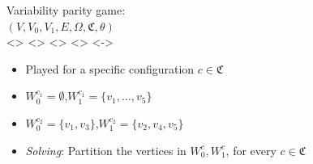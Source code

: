 \documentclass[aspectratio=169]{beamer}
\newcounter{picite}
\begin{document}
\begin{frame}[t]
\begin{columns}[T]
\begin{column}{0.5\textwidth}
	\end{column}
	\begin{column}{0.5\textwidth}
		\large Variability parity game:\small\\%
		$(V,V_0,V_1,E,\Omega,\mathfrak{C},\theta)$\\
			\def\showprio{1}%
			\def\token{-1}%
			\def\playconf{0}%
			\only<\thepicite>{}%
			\only<\thepicite>{}%
			\def\playconf{1}%
			\only<\thepicite>{}%
			\def\playconf{2}%
			\only<\thepicite>{}%
			\def\playconf{0}%
			\only<\thepicite->{}%
		\begin{itemize}\pause
			\item Played for a specific configuration $c \in \mathfrak{C}$\pause
			\item $W_0^{c_1} = \emptyset$,$W_1^{c_1} = \{v_1,\dots,v_5\}$\pause
			\item $W_0^{c_2} = \{v_1,v_3\}$,$W_1^{c_2} = \{v_2,v_4,v_5\}$\pause
			\item \textit{Solving}: Partition the vertices in $W_0^c,W_1^c$, for every $c \in \mathfrak{C}$
		\end{itemize}
	\end{column}
\end{columns}
\end{frame}
\end{document}
